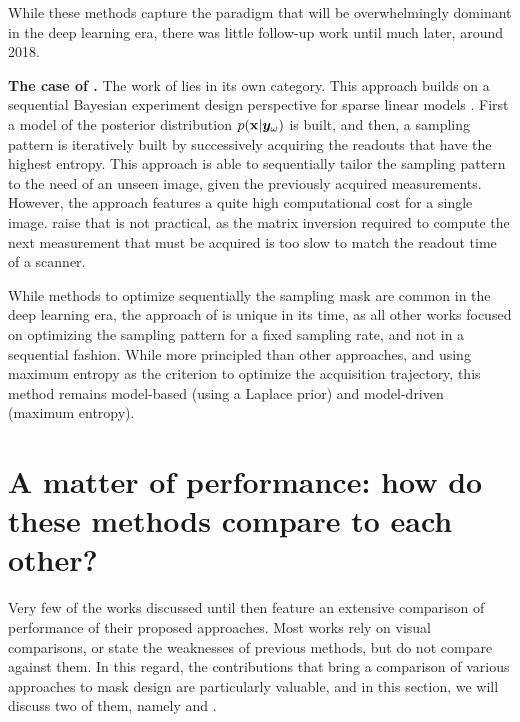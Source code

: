 While these methods capture the paradigm that will be overwhelmingly dominant in the deep learning era, there was little follow-up work until much later, around 2018. 

\textbf{The case of \citet{seeger2010optimization}.} The work of \citet{seeger2010optimization} lies in its own category. This approach builds on a sequential Bayesian experiment design perspective for sparse linear models \citep{seeger2007bayesian, seeger2008compressed}. First a model of the posterior distribution $p({\mathbf{x}}|{\bm{y}}_\omega)$ is built, and then, a sampling pattern is iteratively built by successively acquiring the readouts that have the highest entropy. This approach is able to sequentially tailor the sampling pattern to the need of an unseen image, given the previously acquired measurements. However, the approach features a quite high computational cost for a single image. \citet{liu2012under} raise that is not practical, as the matrix inversion required to compute the next measurement that must be acquired is too slow to match the readout time of a scanner. 

While methods to optimize sequentially the sampling mask are common in the deep learning era, the approach of \citet{seeger2010optimization} is unique in its time, as all other works focused on optimizing the sampling pattern for a fixed sampling rate, and not in a sequential fashion. While more principled than other approaches, and using maximum entropy as the criterion to optimize the acquisition trajectory, this method remains model-based (using a Laplace prior) and model-driven (maximum entropy).

\section{A matter of performance: how do these methods compare to each other?}
Very few of the works discussed until then feature an extensive comparison of performance of their proposed approaches. Most works rely on visual comparisons, or state the weaknesses of previous methods, but do not compare against them. In this regard, the contributions that bring a comparison of various approaches to mask design are particularly valuable, and in this section, we will discuss two of them, namely \citet{chauffert2013variable} and \citet{zijlstra2016evaluation}.

